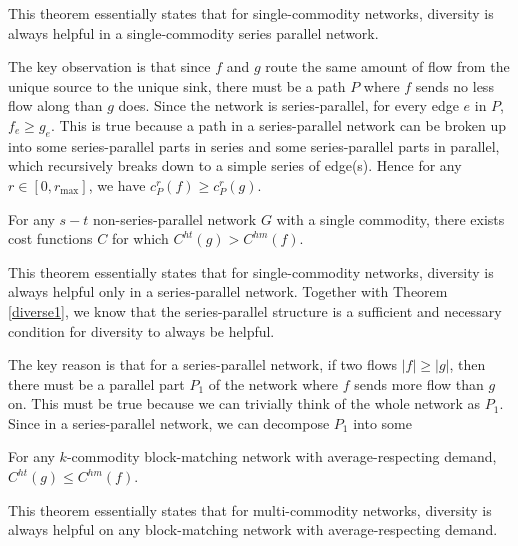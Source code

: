 \begin{proof-sketch}

This theorem essentially states that for single-commodity networks, diversity is always helpful in a single-commodity series parallel network.

The key observation is that since $f$ and $g$ route the same amount of flow from the unique source to the unique sink, there must be a path $P$ where $f$ sends no less flow along than $g$ does. Since the network is series-parallel, for every edge $e$ in $P$, $f_e \ge g_e$. This is true because a path in a series-parallel network can be broken up into some series-parallel parts in series and some series-parallel parts in parallel, which recursively breaks down to a simple series of edge(s). Hence for any $r\in [0, r_{\max}]$, we have $c_P^r(f)\ge c_P^r(g)$.

\end{proof-sketch}



\begin{theorem}
For any $s-t$ non-series-parallel network $G$ with a single commodity, there exists cost functions $C$ for which $C^{ht}(g)> C^{hm}(f)$.
\end{theorem}

\begin{proof-sketch}

This theorem essentially states that for single-commodity networks, diversity is always helpful only in a series-parallel network. Together with Theorem \ref{diverse1}, we know that the series-parallel structure is a sufficient and necessary condition for diversity to always be helpful.

The key reason is that for a series-parallel network, if two flows $|f|\ge |g|$, then there must be a parallel part $P_1$ of the network where $f$ sends more flow than $g$ on. This must be true because we can trivially think of the whole network as $P_1$. Since in a series-parallel network, we can decompose $P_1$ into some
\end{proof-sketch}


\begin{theorem}
For any $k$-commodity block-matching network with average-respecting demand, $C^{ht}(g)\le C^{hm}(f)$.
\label{diverse2}
\end{theorem}

\begin{proof-sketch}

This theorem essentially states that for multi-commodity networks, diversity is always helpful on any block-matching network with average-respecting demand. 
\end{proof-sketch}



